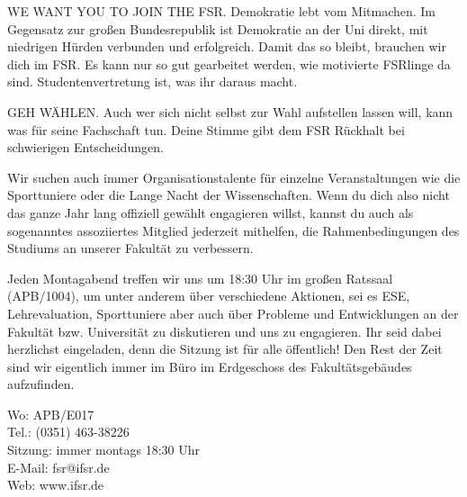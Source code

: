 WE WANT YOU TO JOIN THE FSR.
Demokratie lebt vom Mitmachen.
Im Gegensatz zur großen Bundesrepublik ist Demokratie an der Uni direkt, mit niedrigen Hürden verbunden und erfolgreich.
Damit das so bleibt, brauchen wir dich im FSR.
Es kann nur so gut gearbeitet werden, wie motivierte FSRlinge da sind.
Studentenvertretung ist, was ihr daraus macht.

GEH WÄHLEN.
Auch wer sich nicht selbst zur Wahl aufstellen lassen will, kann was für seine Fachschaft tun.
Deine Stimme gibt dem FSR Rückhalt bei schwierigen Entscheidungen.

Wir suchen auch immer Organisationstalente für einzelne Veranstaltungen wie die Sporttuniere oder die Lange Nacht der Wissenschaften.
Wenn du dich also nicht das ganze Jahr lang offiziell gewählt engagieren willst, kannst du auch als sogenanntes assoziiertes Mitglied jederzeit mithelfen, die Rahmenbedingungen des Studiums an unserer Fakultät zu verbessern.

Jeden Montagabend treffen wir uns um 18:30 Uhr im großen Ratssaal (APB/1004), um unter anderem über verschiedene Aktionen, sei es ESE, Lehrevaluation, Sporttuniere aber auch über Probleme und Entwicklungen an der Fakultät bzw. Universität zu diskutieren und uns zu engagieren.
Ihr seid dabei herzlichst eingeladen, denn die Sitzung ist für alle öffentlich!
Den Rest der Zeit sind wir eigentlich immer im Büro im Erdgeschoss des Fakultätsgebäudes aufzufinden.

Wo: APB/E017 \\
Tel.: (0351) 463-38226 \\
Sitzung: immer montags 18:30 Uhr \\
E-Mail: fsr@ifsr.de \\
Web: www.ifsr.de

\newpage

\newcommand{\fsrler}[5]{%
\fbox{\begin{minipage}{.25\linewidth}
    \centering\vspace{.8em}
    \texttt{[image: img/fsr/200\_\#1]}\\[.6em]
    {\Large #2}\\[.2em]
    {\large#3}\\[.5em]
    \textit{\small #5}\\
    \texttt{\small #4@ifsr.de}\\[-.1em]\ 
\end{minipage}}\hspace{3.5em}%
}

